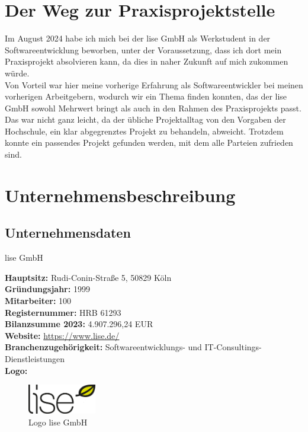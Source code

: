 \chapter{Der Weg zur Praxisprojektstelle}\label{ch:weg_zur_pp}
Im August 2024 habe ich mich bei der lise GmbH als Werkstudent in der Softwareentwicklung beworben, unter der Voraussetzung, dass ich dort  
mein Praxisprojekt absolvieren kann, da dies in naher Zukunft auf mich zukommen würde.\\  
Von Vorteil war hier meine vorherige Erfahrung als Softwareentwickler bei meinen vorherigen Arbeitgebern, wodurch wir ein  
Thema finden konnten, das der lise GmbH sowohl Mehrwert bringt als auch in den Rahmen des Praxisprojekts passt.\\  
Das war nicht ganz leicht, da der übliche Projektalltag von den Vorgaben der Hochschule, ein klar abgegrenztes Projekt zu behandeln, abweicht.  
Trotzdem konnte ein passendes Projekt gefunden werden, mit dem alle Parteien zufrieden sind.

\chapter{Unternehmensbeschreibung}\label{ch:unternehmen}
\section{Unternehmensdaten}\label{sec:nternehmensdaten}
lise GmbH

\textbf{Hauptsitz:} Rudi-Conin-Straße 5, 50829 Köln\\
\textbf{Gründungsjahr:} 1999\\
\textbf{Mitarbeiter: } 100\\
\textbf{Registernummer: } HRB 61293\\
\textbf{Bilanzsumme 2023: } 4.907.296,24 EUR \autocite{unternehmensregister2024}\\
\textbf{Website:} \url{https://www.lise.de/}\\
\textbf{Branchenzugehörigkeit:} Softwareentwicklungs- und IT-Consultings-Dienstleistungen\\
\textbf{Logo:}
\begin{figure}[H]
    \begin{center}
        \includegraphics[width=3cm]{bilder/lise_logo_web.png}
        \caption{Logo lise GmbH}\label{fig:lise}
    \end{center}
\end{figure}

